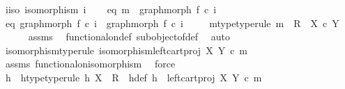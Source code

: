 \begin{isabellebody}
\ i{}{\isacharunderscore}{\kern0pt}iso{\isacharcolon}{\kern0pt}\ {\isachardoublequoteopen}isomorphism\ i{}{\isachardoublequoteclose}\isanewline
\ \ \isamarkupfalse%
\ eq{}{\isacharcolon}{\kern0pt}\ {\isachardoublequoteopen}m\ {\isacharequal}{\kern0pt}\ graph{\isacharunderscore}{\kern0pt}morph\ f{}\ {\isasymcirc}\isactrlsub c\ i{}{\isachardoublequoteclose}\isanewline
\ \ \isamarkupfalse%
\ eq{}{\isacharcolon}{\kern0pt}\ {\isachardoublequoteopen}graph{\isacharunderscore}{\kern0pt}morph\ f{}\ {\isasymcirc}\isactrlsub c\ i{}\ {\isacharequal}{\kern0pt}\ graph{\isacharunderscore}{\kern0pt}morph\ f{}\ {\isasymcirc}\isactrlsub c\ i{}{\isachardoublequoteclose}\ \isanewline
\isanewline
\ \ \isamarkupfalse%
\ m{\isacharunderscore}{\kern0pt}type{\isacharbrackleft}{\kern0pt}type{\isacharunderscore}{\kern0pt}rule{\isacharbrackright}{\kern0pt}{\isacharcolon}{\kern0pt}\ {\isachardoublequoteopen}m\ {\isacharcolon}{\kern0pt}\ R\ {\isasymrightarrow}\ X\ {\isasymtimes}\isactrlsub c\ Y{\isachardoublequoteclose}\isanewline
\ \ \ \ \isamarkupfalse%
\ assms\ \isamarkupfalse%
\ functional{\isacharunderscore}{\kern0pt}on{\isacharunderscore}{\kern0pt}def\ subobject{\isacharunderscore}{\kern0pt}of{\isacharunderscore}{\kern0pt}def{}\ \isamarkupfalse%
\ auto\isanewline
\ \ \isamarkupfalse%
\ isomorphism{\isacharbrackleft}{\kern0pt}type{\isacharunderscore}{\kern0pt}rule{\isacharbrackright}{\kern0pt}{\isacharcolon}{\kern0pt}\ {\isachardoublequoteopen}isomorphism{\isacharparenleft}{\kern0pt}left{\isacharunderscore}{\kern0pt}cart{\isacharunderscore}{\kern0pt}proj\ X\ Y\ {\isasymcirc}\isactrlsub c\ m{\isacharparenright}{\kern0pt}{\isachardoublequoteclose}\isanewline
\ \ \ \ \isamarkupfalse%
\ assms\ functional{\isacharunderscore}{\kern0pt}on{\isacharunderscore}{\kern0pt}isomorphism\ \isamarkupfalse%
\ force\ \ \isanewline
\ \ \isamarkupfalse%
\ h\ \ h{\isacharunderscore}{\kern0pt}type{\isacharbrackleft}{\kern0pt}type{\isacharunderscore}{\kern0pt}rule{\isacharbrackright}{\kern0pt}{\isacharcolon}{\kern0pt}\ {\isachardoublequoteopen}h{\isacharcolon}{\kern0pt}\ X\ {\isasymrightarrow}\ R{\isachardoublequoteclose}\ \ h{\isacharunderscore}{\kern0pt}def{\isacharcolon}{\kern0pt}\ {\isachardoublequoteopen}h\ {\isacharequal}{\kern0pt}\ {\isacharparenleft}{\kern0pt}left{\isacharunderscore}{\kern0pt}cart{\isacharunderscore}{\kern0pt}proj\ X\ Y\ {\isasymcirc}\isactrlsub c\ m{\isacharparenright}{\kern0pt}\isactrlbold {\isasyminverse}{\isachardoublequoteclose}\isanewline

\end{isabellebody}
